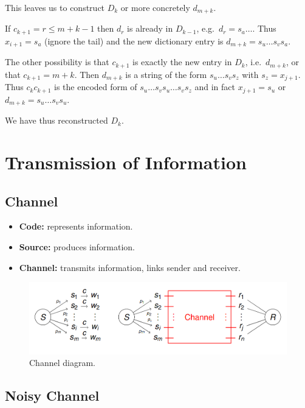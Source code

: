 \documentclass[11pt]{article}
\begin{document}
This leaves us to construct $D_k$ or more concretely $d_{m + k}$.

If $c_{k + 1} = r \leq m + k - 1$ then $d_r$ is already in $D_{k - 1}$, e.g.\ $d_r = s_a \ldots$.
Thus $x_{i + 1} = s_a$ (ignore the tail) and the new dictionary entry is $d_{m + k} = s_u \ldots s_v s_a$.

The other possibility is that $c_{k + 1}$ is exactly the new entry in $D_k$, i.e.\ $d_{m + k}$, or that $c_{k + 1} = m + k$.
Then $d_{m + k}$ is a string of the form $s_u \ldots s_v s_z$ with $s_z = x_{j + 1}$.
Thus $c_k c_{k + 1}$ is the encoded form of $s_u \ldots s_v s_u \ldots s_v s_z$ and in fact $x_{j + 1} = s_u$ or $d_{m + k} = s_u \ldots s_v s_u$.

We have thus reconstructed $D_k$.

\section{Transmission of Information}
\subsection{Channel}
\begin{itemize}
  \item \textbf{Code:} represents information.
  \item \textbf{Source:} produces information.
  \item \textbf{Channel:} transmits information, links sender and receiver.
\end{itemize}

\begin{figure}[h]
  \caption{Channel diagram.}
  \centering
  \includegraphics[width=\textwidth]{channel}
\end{figure}

\subsection{Noisy Channel}
\end{document}
